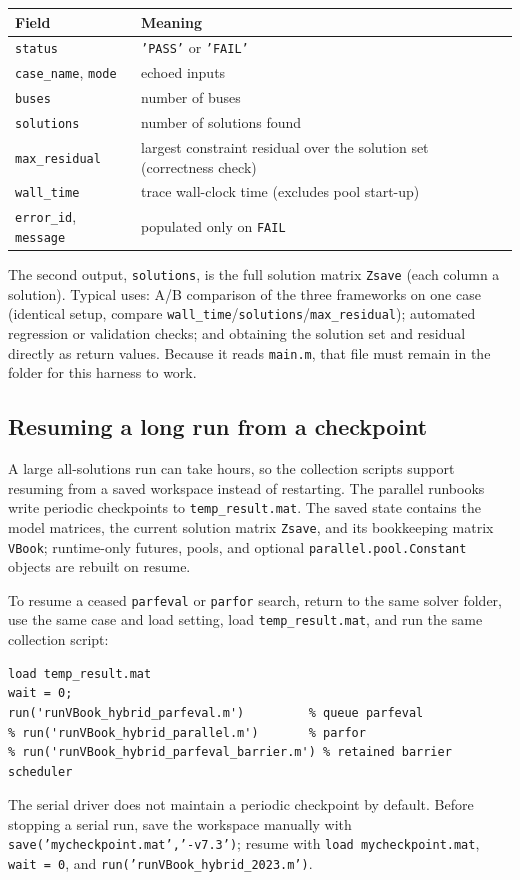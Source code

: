 \documentclass[11pt,a4paper]{article}
\newcommand{\code}[1]{\texttt{#1}}
\begin{document}
\begin{center}\small
\begin{tabular}{@{}ll@{}}
\toprule
Field & Meaning\\
\midrule
\code{status} & \code{'PASS'} or \code{'FAIL'}\\
\code{case_name}, \code{mode} & echoed inputs\\
\code{buses} & number of buses\\
\code{solutions} & number of solutions found\\
\code{max_residual} & largest constraint residual over the solution set (correctness check)\\
\code{wall_time} & trace wall-clock time (excludes pool start-up)\\
\code{error_id}, \code{message} & populated only on \code{FAIL}\\
\bottomrule
\end{tabular}
\end{center}
The second output, \code{solutions}, is the full solution matrix \code{Zsave} (each column
a solution). Typical uses: A/B comparison of the three frameworks on one case (identical
setup, compare \code{wall_time}/\code{solutions}/\code{max_residual}); automated
regression or validation checks; and obtaining the solution set and residual directly as
return values. Because it reads \code{main.m}, that file must remain in the folder for
this harness to work.

\subsection{Resuming a long run from a checkpoint}\label{sec:resume}
A large all-solutions run can take hours, so the collection scripts support resuming from a
saved workspace instead of restarting. The parallel runbooks write periodic checkpoints to
\code{temp_result.mat}. The saved state contains the model matrices, the current solution
matrix \code{Zsave}, and its bookkeeping matrix \code{VBook}; runtime-only futures, pools,
and optional \code{parallel.pool.Constant} objects are rebuilt on resume.

To resume a ceased \code{parfeval} or \code{parfor} search, return to the same solver
folder, use the same case and load setting, load \code{temp_result.mat}, and run the same
collection script:
\begin{lstlisting}[style=mat]
load temp_result.mat
wait = 0;
run('runVBook_hybrid_parfeval.m')         % queue parfeval
% run('runVBook_hybrid_parallel.m')       % parfor
% run('runVBook_hybrid_parfeval_barrier.m') % retained barrier scheduler
\end{lstlisting}
The serial driver does not maintain a periodic checkpoint by default. Before stopping a
serial run, save the workspace manually with \code{save('mycheckpoint.mat','-v7.3')}; resume
with \code{load mycheckpoint.mat}, \code{wait = 0}, and
\code{run('runVBook_hybrid_2023.m')}.
\end{document}
